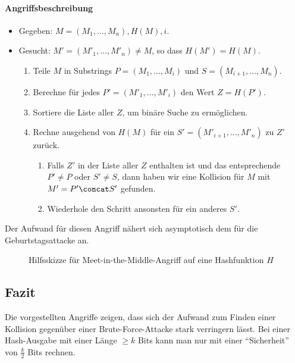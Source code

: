 \paragraph*{Angriffsbeschreibung}
\begin{itemize}
\item Gegeben: $M = (M_1,\dots,M_n), H(M), i$.
\item Gesucht: $M' = (M'_1,\dots,M'_n) \neq M$, so dass $H(M') = H(M)$.
  \begin{enumerate}
  \item Teile $M$ in Substrings $P = (M_1,\dots,M_i)$ und $S = (M_{i+1},\dots,M_{n})$.
  \item Berechne für jedes $P' = (M'_1,\dots,M'_i)$ den Wert $Z = H(P')$.
  \item Sortiere die Liste aller $Z$, um binäre Suche zu ermöglichen.
  \item Rechne ausgehend von $H(M)$ für ein $S' =
    (M'_{i+1},\dots,M'_{n})$ zu $Z'$ zurück. 
    \begin{enumerate}
    \item Falls $Z'$ in der Liste aller $Z$ enthalten ist und das
      entsprechende $P' \neq P$ oder $S' \neq S$, dann haben wir eine
      Kollision für $M$ mit $M' = P' \concat S'$ gefunden. 
    \item Wiederhole den Schritt ansonsten für ein anderes $S'$.
    \end{enumerate}
  \end{enumerate}
\end{itemize}
Der Aufwand für diesen Angriff nähert sich asymptotisch dem für die
Geburtstagsattacke an. 

\begin{figure}[h]
  \centering
  \caption{Hilfsskizze für Meet-in-the-Middle-Angriff auf eine Hashfunktion $H$}
  \label{fig:md-meet-in-the-middle-attack}
\end{figure}
\subsection{Fazit}
Die vorgestellten Angriffe zeigen, dass sich der Aufwand zum Finden
einer Kollision gegenüber einer Brute-Force-Attacke stark verringern
lässt. Bei einer Hash-Ausgabe mit einer Länge $\geq k$ Bits kann man nur
mit einer "`Sicherheit"' von $\frac{k}{2}$ Bits rechnen.
